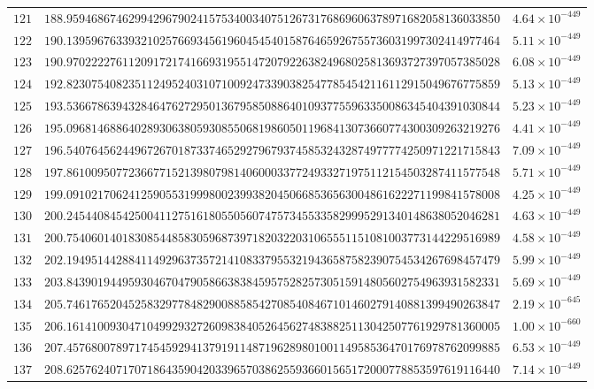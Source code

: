 \documentclass[12pt,reqno]{amsart}
\theoremstyle{remark}
\begin{document}
\begin{longtable}{clc}
$121$ & $188.9594686746299429679024157534003407512673176869606378971682058136033850$ & $4.64\times 10^{-449}$ \\
$122$ & $190.1395967633932102576693456196045454015876465926755736031997302414977464$ & $5.11\times 10^{-449}$ \\
$123$ & $190.9702222761120917217416693195514720792263824968025813693727397057385028$ & $6.08\times 10^{-449}$ \\
$124$ & $192.8230754082351124952403107100924733903825477854542116112915049676775859$ & $5.13\times 10^{-449}$ \\
$125$ & $193.5366786394328464762729501367958508864010937755963350086345404391030844$ & $5.23\times 10^{-449}$ \\
$126$ & $195.0968146886402893063805930855068198605011968413073660774300309263219276$ & $4.41\times 10^{-449}$ \\
$127$ & $196.5407645624496726701873374652927967937458532432874977774250971221715843$ & $7.09\times 10^{-449}$ \\
$128$ & $197.8610095077236677152139807981406000337724933271975112154503287411577548$ & $5.71\times 10^{-449}$ \\
$129$ & $199.0910217062412590553199980023993820450668536563004861622271199841578008$ & $4.25\times 10^{-449}$ \\
$130$ & $200.2454408454250041127516180550560747573455335829995291340148638052046281$ & $4.63\times 10^{-449}$ \\
$131$ & $200.7540601401830854485830596873971820322031065551151081003773144229516989$ & $4.58\times 10^{-449}$ \\
$132$ & $202.1949514428841149296373572141083379553219436587582390754534267698457479$ & $5.99\times 10^{-449}$ \\
$133$ & $203.8439019449593046704790586638384595752825730515914805602754963931582331$ & $5.69\times 10^{-449}$ \\
$134$ & $205.7461765204525832977848290088585427085408467101460279140881399490263847$ & $2.19\times 10^{-645}$ \\
$135$ & $206.1614100930471049929327260983840526456274838825113042507761929781360005$ & $1.00\times 10^{-660}$ \\
$136$ & $207.4576800789717454592941379191148719628980100114958536470176978762099885$ & $6.53\times 10^{-449}$ \\
$137$ & $208.6257624071707186435904203396570386255936601565172000778853597619116440$ & $7.14\times 10^{-449}$ \\

\end{longtable}
\end{document}

